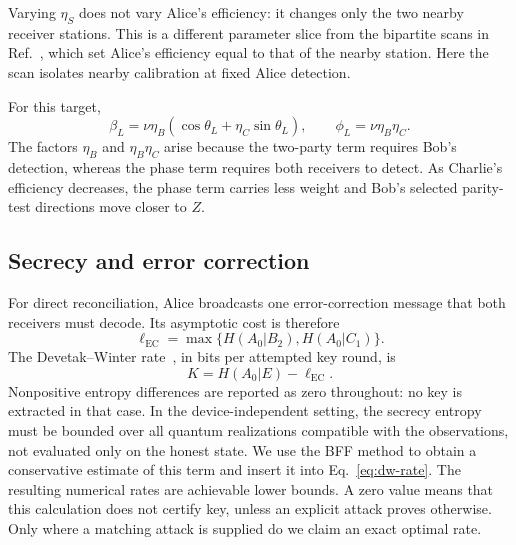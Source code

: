 \documentclass[aps,10pt,onecolumn,prx,superscriptaddress,longbibliography,nofootinbib]{revtex4-2}
\newcommand{\EC}{\ell_{\mathrm{EC}}}
\begin{document}
Varying \(\eta_S\) does not vary Alice's efficiency: it changes only the two nearby receiver stations. This is a different parameter slice from the bipartite scans in Ref.~\cite{LeRoy2025}, which set Alice's efficiency equal to that of the nearby station. Here the scan isolates nearby calibration at fixed Alice detection.

For this target,
\begin{equation}
 \beta_L=\nu\eta_B(\cos\theta_L+\eta_C\sin\theta_L),
 \qquad
 \phi_L=\nu\eta_B\eta_C.
 \label{eq:remote-target-summaries}
\end{equation}
The factors $\eta_B$ and $\eta_B\eta_C$ arise because the two-party term requires Bob's detection, whereas the phase term requires both receivers to detect. As Charlie's efficiency decreases, the phase term carries less weight and Bob's selected parity-test directions move closer to \(Z\).

\subsection{Secrecy and error correction}\label{sec:rate-evaluation}

For direct reconciliation, Alice broadcasts one error-correction message that both receivers must decode. Its asymptotic cost is therefore
\begin{equation}
 \EC=\max\{H(A_0|B_2),H(A_0|C_1)\}.
 \label{eq:entropy-and-ec}
\end{equation}
The Devetak--Winter rate~\cite{DevetakWinter2005}, in bits per attempted key round, is
\begin{equation}
 K=H(A_0|E)-\EC.
 \label{eq:dw-rate}
\end{equation}
Nonpositive entropy differences are reported as zero throughout: no key is extracted in that case. In the device-independent setting, the secrecy entropy must be bounded over all quantum realizations compatible with the observations, not evaluated only on the honest state. We use the BFF method to obtain a conservative estimate of this term and insert it into Eq.~\eqref{eq:dw-rate}. The resulting numerical rates are achievable lower bounds. A zero value means that this calculation does not certify key, unless an explicit attack proves otherwise. Only where a matching attack is supplied do we claim an exact optimal rate.
\end{document}
